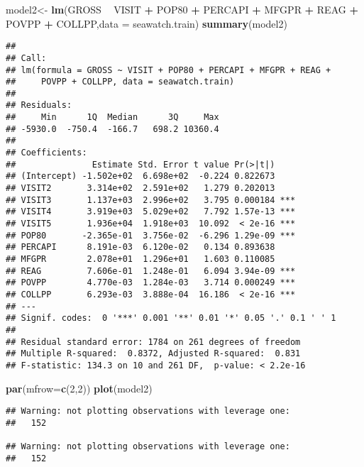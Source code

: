 \documentclass[]{article}
\newenvironment{Shaded}{\begin{snugshade}}{\end{snugshade}}
\newcommand{\KeywordTok}[1]{\textcolor[rgb]{0.13,0.29,0.53}{\textbf{#1}}}
\newcommand{\DataTypeTok}[1]{\textcolor[rgb]{0.13,0.29,0.53}{#1}}
\newcommand{\DecValTok}[1]{\textcolor[rgb]{0.00,0.00,0.81}{#1}}
\newcommand{\StringTok}[1]{\textcolor[rgb]{0.31,0.60,0.02}{#1}}
\newcommand{\OperatorTok}[1]{\textcolor[rgb]{0.81,0.36,0.00}{\textbf{#1}}}
\newcommand{\NormalTok}[1]{#1}
\begin{document}
\begin{Shaded}
\begin{Highlighting}[]
\NormalTok{model2<-}\StringTok{ }\KeywordTok{lm}\NormalTok{(GROSS }\OperatorTok{~}\StringTok{ }\NormalTok{VISIT }\OperatorTok{+}\StringTok{ }\NormalTok{POP80 }\OperatorTok{+}\StringTok{ }\NormalTok{PERCAPI }\OperatorTok{+}\StringTok{ }\NormalTok{MFGPR }\OperatorTok{+}\StringTok{ }\NormalTok{REAG }\OperatorTok{+}\StringTok{ }\NormalTok{POVPP }\OperatorTok{+}\StringTok{ }\NormalTok{COLLPP,}\DataTypeTok{data =}\NormalTok{ seawatch.train)}
\KeywordTok{summary}\NormalTok{(model2)}
\end{Highlighting}
\end{Shaded}

\begin{verbatim}
## 
## Call:
## lm(formula = GROSS ~ VISIT + POP80 + PERCAPI + MFGPR + REAG + 
##     POVPP + COLLPP, data = seawatch.train)
## 
## Residuals:
##     Min      1Q  Median      3Q     Max 
## -5930.0  -750.4  -166.7   698.2 10360.4 
## 
## Coefficients:
##               Estimate Std. Error t value Pr(>|t|)    
## (Intercept) -1.502e+02  6.698e+02  -0.224 0.822673    
## VISIT2       3.314e+02  2.591e+02   1.279 0.202013    
## VISIT3       1.137e+03  2.996e+02   3.795 0.000184 ***
## VISIT4       3.919e+03  5.029e+02   7.792 1.57e-13 ***
## VISIT5       1.936e+04  1.918e+03  10.092  < 2e-16 ***
## POP80       -2.365e-01  3.756e-02  -6.296 1.29e-09 ***
## PERCAPI      8.191e-03  6.120e-02   0.134 0.893638    
## MFGPR        2.078e+01  1.296e+01   1.603 0.110085    
## REAG         7.606e-01  1.248e-01   6.094 3.94e-09 ***
## POVPP        4.770e-03  1.284e-03   3.714 0.000249 ***
## COLLPP       6.293e-03  3.888e-04  16.186  < 2e-16 ***
## ---
## Signif. codes:  0 '***' 0.001 '**' 0.01 '*' 0.05 '.' 0.1 ' ' 1
## 
## Residual standard error: 1784 on 261 degrees of freedom
## Multiple R-squared:  0.8372, Adjusted R-squared:  0.831 
## F-statistic: 134.3 on 10 and 261 DF,  p-value: < 2.2e-16
\end{verbatim}

\begin{Shaded}
\begin{Highlighting}[]
\KeywordTok{par}\NormalTok{(}\DataTypeTok{mfrow=}\KeywordTok{c}\NormalTok{(}\DecValTok{2}\NormalTok{,}\DecValTok{2}\NormalTok{))}
\KeywordTok{plot}\NormalTok{(model2)}
\end{Highlighting}
\end{Shaded}

\begin{verbatim}
## Warning: not plotting observations with leverage one:
##   152

## Warning: not plotting observations with leverage one:
##   152
\end{verbatim}
\end{document}
